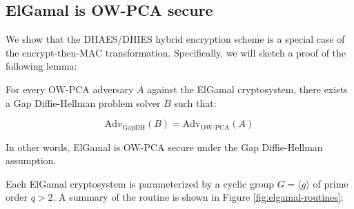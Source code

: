 \documentclass[journal=tches,submission]{iacrtrans}
\begin{document}
\subsection{ElGamal is OW-PCA secure}\label{sec:elgamal-is-ow-pca}
We show that the DHAES/DHIES hybrid encryption scheme is a special case of the encrypt-then-MAC transformation. Specifically, we will sketch a proof of the following lemma:

\begin{lemma}\label{lemma:elgamal-is-ow-pca}
    For every OW-PCA adversary $A$ against the ElGamal cryptosystem, there exists a Gap Diffie-Hellman problem solver $B$ such that:

    \begin{equation*}
        \text{Adv}_\text{GapDH}(B) = \text{Adv}_\text{OW-PCA}(A)
    \end{equation*}

    In other words, ElGamal is OW-PCA secure under the Gap Diffie-Hellman assumption.
\end{lemma}

Each ElGamal cryptosystem \cite{DBLP:journals/tit/Elgamal85} is parameterized by a cyclic group $G = \langle g \rangle$ of prime order $q > 2$. A summary of the routine is shown in Figure \ref{fig:elgamal-routines}:
\end{document}
